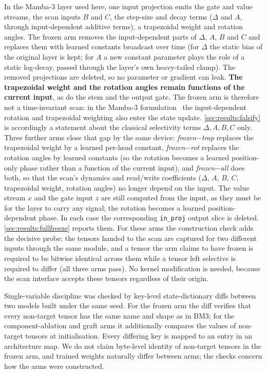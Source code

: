 In the Mamba-3 layer used here, one input projection emits the gate and value streams, the scan inputs $B$ and $C$, the step-size and decay terms ($\Delta$ and $A$, through input-dependent additive terms), a trapezoidal weight and rotation angles. The frozen arm removes the input-dependent parts of $\Delta$, $A$, $B$ and $C$ and replaces them with learned constants broadcast over time (for $\Delta$ the static bias of the original layer is kept; for $A$ a new constant parameter plays the role of a static log-decay, passed through the layer's own heavy-tailed clamp). The removed projections are deleted, so no parameter or gradient can leak. \textbf{The trapezoidal weight and the rotation angles remain functions of the current input}, as do the stem and the output gate. The frozen arm is therefore not a time-invariant scan: in the Mamba-3 formulation~\cite{lahoti2026mamba3} the input-dependent rotation and trapezoidal weighting also enter the state update. \ref{sec:results:falsify} is accordingly a statement about the classical selectivity terms $\Delta, A, B, C$ only. Three further arms close that gap by the same device: \emph{frozen$-$trap} replaces the trapezoidal weight by a learned per-head constant, \emph{frozen$-$rot} replaces the rotation angles by learned constants (so the rotation becomes a learned position-only phase rather than a function of the current input), and \emph{frozen$-$all} does both, so that the scan's dynamics and read/write coefficients ($\Delta$, $A$, $B$, $C$, trapezoidal weight, rotation angles) no longer depend on the input. The value stream $x$ and the gate input $z$ are still computed from the input, as they must be for the layer to carry any signal; the rotation becomes a learned position-dependent phase. In each case the corresponding \texttt{in\_proj} output slice is deleted. \ref{sec:results:fullfreeze} reports them. For these arms the construction check adds the decisive probe: the tensors handed to the scan are captured for two different inputs through the same module, and a tensor the arm claims to have frozen is required to be bitwise identical across them while a tensor left selective is required to differ (all three arms pass). No kernel modification is needed, because the scan interface accepts these tensors regardless of their origin.

Single-variable discipline was checked by key-level state-dictionary diffs between two models built under the same seed. For the frozen arm the diff verifies that every non-target tensor has the same name and shape as in BM3; for the component-ablation and graft arms it additionally compares the values of non-target tensors at initialisation. Every differing key is mapped to an entry in an architecture map. We do not claim byte-level identity of non-target tensors in the frozen arm, and trained weights naturally differ between arms; the checks concern how the arms were constructed.

